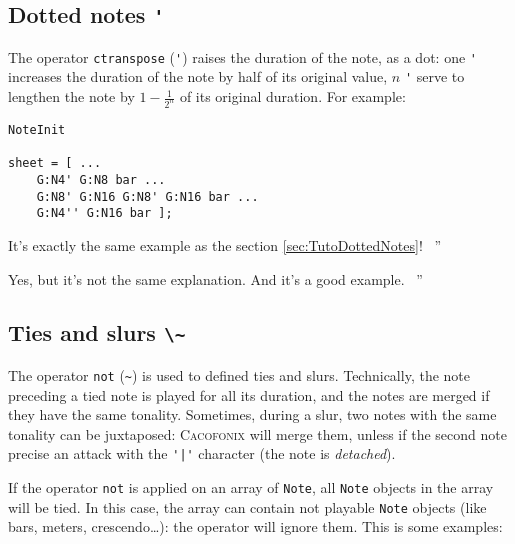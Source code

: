 \documentclass{article}
\newcommand{\cacofonix}{\textsc{Cacofonix}\xspace}
\newcommand{\note}{\lstinline!Note!\xspace}
\newenvironment{meenv}{ \par \noindent \makebox[6em][r]{ \textcolor{mecolor}{Me}: `` --~}}{~''}
\newenvironment{myselfenv}{ \par \noindent \makebox[6em][r]{ \textcolor{myselfcolor}{Myself}: `` --~}}{~''}
\newcommand{ \me }[1]{%
\begin{meenv}%
	#1%
\end{meenv} }
\newcommand{ \myself }[1]{%
\begin{myselfenv}%
	#1%
\end{myselfenv} }
\begin{document}
\subsection{Dotted notes \lstinline!'!}
\label{sec:DottedNotes}

The operator \lstinline!ctranspose! (\lstinline!'!) raises the duration of the note, as a dot: one \lstinline!'! increases the duration of the note by half of its original value, $n$ \lstinline!'! serve to lengthen the note by $1 - \frac{1}{2^n}$ of its original duration. For example: \\

\begin{lstlisting}
NoteInit

sheet = [ ...
	G:N4' G:N8 bar ...
	G:N8' G:N16 G:N8' G:N16 bar ...
	G:N4'' G:N16 bar ];
\end{lstlisting}

\me{It's exactly the same example as the section \ref{sec:TutoDottedNotes}!}
\myself{Yes, but it's not the same explanation. And it's a good example.}

\subsection{Ties and slurs \lstinline!\~!}
\label{sec:TiesAndSlurs}

The operator \lstinline!not! (\lstinline!~!) is used to defined ties and slurs. Technically, the note preceding a tied note is played for all its duration, and the notes are merged if they have the same tonality. Sometimes, during a slur, two notes with the same tonality can be juxtaposed: \cacofonix will merge them, unless if the second note precise an attack with the \lstinline!'|'! character (the note is \emph{detached}).

If the operator \lstinline!not! is applied on an array of \note, all \note objects in the array will be tied. In this case, the array can contain not playable \note objects (like bars, meters, crescendo\dots): the operator will ignore them. This is some examples: \\
\end{document}

